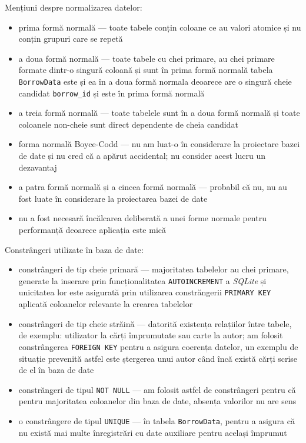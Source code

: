 \documentclass{article}
\begin{document}
    Mențiuni despre normalizarea datelor:
    \begin{itemize}
        \item prima formă normală --- toate tabele conțin coloane ce au valori atomice și nu conțin grupuri care se repetă
        \item a doua formă normală --- toate tabele cu chei primare, au chei primare formate dintr-o singură coloană și sunt
        în prima formă normală tabela \texttt{BorrowData} este și ea în a doua formă normala deoarece are o singură cheie
        candidat \texttt{borrow\_id} și este în prima formă normală
        \item a treia formă normală --- toate tabelele sunt în a doua formă normală și toate coloanele non-cheie sunt direct
        dependente de cheia candidat
        \item forma normală Boyce-Codd --- nu am luat-o în considerare la proiectare bazei de date și nu cred că a apărut accidental;
        nu consider acest lucru un dezavantaj
        \item a patra formă normală și a cincea formă normală --- probabil că nu, nu au fost luate în considerare la proiectarea
        bazei de date
        \item nu a fost necesară încălcarea deliberată a unei forme normale pentru performanță deoarece aplicația este mică
    \end{itemize}
    Constrângeri utilizate în baza de date:
    \begin{itemize}
        \item constrângeri de tip cheie primară --- majoritatea tabelelor au chei primare, generate la inserare prin
        funcționalitatea \texttt{AUTOINCREMENT} a \emph{SQLite} și unicitatea lor este asigurată prin utilizarea
        constrăngerii \texttt{PRIMARY KEY} aplicată coloanelor relevante la crearea tabelelor
        \item constrângeri de tip cheie străină --- datorită existența relațiilor între tabele, de exemplu: utilizator
        la cărți împrumutate sau carte la autor; am folosit constrângerea \texttt{FOREIGN KEY} pentru a asigura coerența
        datelor, un exemplu de situație prevenită astfel este ștergerea unui autor când încă există cărți scrise de el
        în baza de date
        \item constrăngeri de tipul \texttt{NOT NULL} --- am folosit astfel de constrângeri pentru că pentru majoritatea
        coloanelor din baza de date, absența valorilor nu are sens
        \item o constrângere de tipul \texttt{UNIQUE} --- în tabela \texttt{BorrowData}, pentru a asigura că nu există mai
        multe înregistrări cu date auxiliare pentru același împrumut
    \end{itemize}
\end{document}
